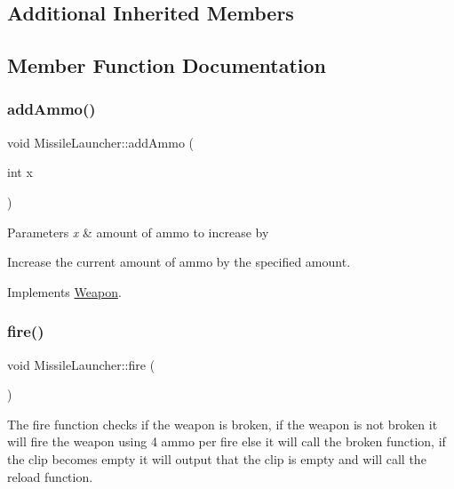 \subsection*{Additional Inherited Members}


\subsection{Member Function Documentation}
\mbox{\label{classMissileLauncher_a5952ed03f14045ce84c4c58af6812cfb}} 
\subsubsection{\texorpdfstring{add\+Ammo()}{addAmmo()}}
{\footnotesize\ttfamily void Missile\+Launcher\+::add\+Ammo (\begin{DoxyParamCaption}\item[{int}]{x }\end{DoxyParamCaption})\hspace{0.3cm}{\ttfamily [virtual]}}


\begin{DoxyParams}{Parameters}
{\em x} & amount of ammo to increase by\\
\hline
\end{DoxyParams}
Increase the current amount of ammo by the specified amount. 

Implements \hyperlink{classWeapon}{Weapon}.

\mbox{\label{classMissileLauncher_a0f954b8fd239dca4a3bb230c279df1e5}} 
\subsubsection{\texorpdfstring{fire()}{fire()}}
{\footnotesize\ttfamily void Missile\+Launcher\+::fire (\begin{DoxyParamCaption}{ }\end{DoxyParamCaption})\hspace{0.3cm}{\ttfamily [virtual]}}

The fire function checks if the weapon is broken, if the weapon is not broken it will fire the weapon using 4 ammo per fire else it will call the broken function, if the clip becomes empty it will output that the clip is empty and will call the reload function. 

